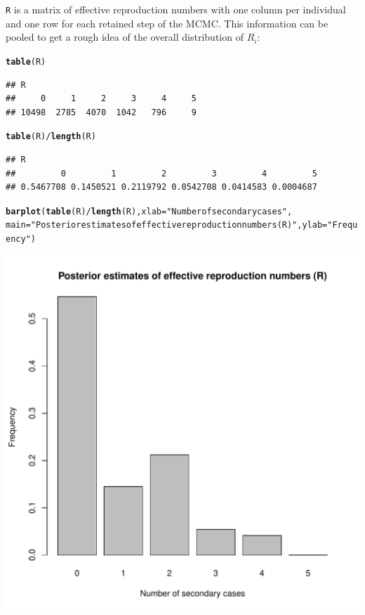 \documentclass{article}\usepackage[]{graphicx}\usepackage[]{color}
\makeatletter
\newcommand{\hlstr}[1]{\textcolor[rgb]{0.192,0.494,0.8}{#1}}%
\newcommand{\hlopt}[1]{\textcolor[rgb]{0,0,0}{#1}}%
\newcommand{\hlstd}[1]{\textcolor[rgb]{0.345,0.345,0.345}{#1}}%
\newcommand{\hlkwc}[1]{\textcolor[rgb]{0.333,0.667,0.333}{#1}}%
\newcommand{\hlkwd}[1]{\textcolor[rgb]{0.737,0.353,0.396}{\textbf{#1}}}%
\newenvironment{kframe}{%
 \def\at@end@of@kframe{}%
 \ifinner\ifhmode%
  \def\at@end@of@kframe{\end{minipage}}%
  \begin{minipage}{\columnwidth}%
 \fi\fi%
 \def\FrameCommand##1{\hskip\@totalleftmargin \hskip-\fboxsep
 \colorbox{shadecolor}{##1}\hskip-\fboxsep
     \hskip-\linewidth \hskip-\@totalleftmargin \hskip\columnwidth}%
 \MakeFramed {\advance\hsize-\width
   \@totalleftmargin\z@ \linewidth\hsize
   \@setminipage}}%
 {\par\unskip\endMakeFramed%
 \at@end@of@kframe}
\newenvironment{knitrout}{}{} %
\makeatother
\begin{document}
\texttt{R} is a matrix of effective reproduction numbers with one column per individual and one row
for each retained step of the MCMC.
This information can be pooled to get a rough idea of the overall distribution of $R_i$:
\begin{knitrout}
\color{fgcolor}\begin{kframe}
\begin{alltt}
\hlkwd{table}\hlstd{(R)}
\end{alltt}
\begin{verbatim}
## R
##     0     1     2     3     4     5 
## 10498  2785  4070  1042   796     9
\end{verbatim}
\begin{alltt}
\hlkwd{table}\hlstd{(R)}\hlopt{/}\hlkwd{length}\hlstd{(R)}
\end{alltt}
\begin{verbatim}
## R
##         0         1         2         3         4         5 
## 0.5467708 0.1450521 0.2119792 0.0542708 0.0414583 0.0004687
\end{verbatim}
\begin{alltt}
\hlkwd{barplot}\hlstd{(}\hlkwd{table}\hlstd{(R)}\hlopt{/}\hlkwd{length}\hlstd{(R),} \hlkwc{xlab}\hlstd{=}\hlstr{"Number of secondary cases"}\hlstd{,}
        \hlkwc{main}\hlstd{=}\hlstr{"Posterior estimates of effective reproduction numbers (R)"}\hlstd{,} \hlkwc{ylab}\hlstd{=}\hlstr{"Frequency"}\hlstd{)}
\end{alltt}
\end{kframe}

{\centering \includegraphics[width=.6\textwidth]{figs/unnamed-chunk-54} 

}



\end{knitrout}
\end{document}

